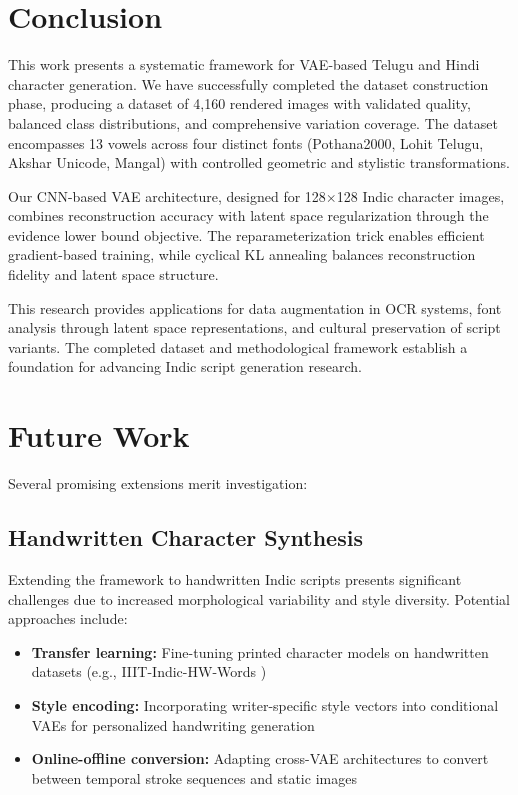 \documentclass[review]{elsarticle}
\begin{document}
\section{Conclusion}
\label{sec:conclusion}

This work presents a systematic framework for VAE-based Telugu and Hindi character generation. We have successfully completed the dataset construction phase, producing a dataset of 4,160 rendered images with validated quality, balanced class distributions, and comprehensive variation coverage. The dataset encompasses 13 vowels across four distinct fonts (Pothana2000, Lohit Telugu, Akshar Unicode, Mangal) with controlled geometric and stylistic transformations.

Our CNN-based VAE architecture, designed for 128$\times$128 Indic character images, combines reconstruction accuracy with latent space regularization through the evidence lower bound objective. The reparameterization trick enables efficient gradient-based training, while cyclical KL annealing balances reconstruction fidelity and latent space structure.

This research provides applications for data augmentation in OCR systems, font analysis through latent space representations, and cultural preservation of script variants. The completed dataset and methodological framework establish a foundation for advancing Indic script generation research.

\section{Future Work}
\label{sec:future}

Several promising extensions merit investigation:

\subsection{Handwritten Character Synthesis}

Extending the framework to handwritten Indic scripts presents significant challenges due to increased morphological variability and style diversity. Potential approaches include:

\begin{itemize}
\item \textbf{Transfer learning:} Fine-tuning printed character models on handwritten datasets (e.g., IIIT-Indic-HW-Words \cite{krishnan2021})
\item \textbf{Style encoding:} Incorporating writer-specific style vectors into conditional VAEs for personalized handwriting generation
\item \textbf{Online-offline conversion:} Adapting cross-VAE architectures \cite{sumi2019} to convert between temporal stroke sequences and static images
\end{itemize}
\end{document}
